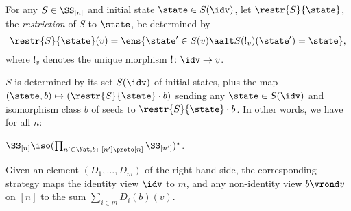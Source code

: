 \documentclass{LMCS}
\theoremstyle{plain}\newtheorem{satz}[thm]{Satz}
\begin{document}
\begin{defi}\label{def:restriction}
  For any $S \in \SS_{[n]}$ and initial state $\state \in S(\idv)$, let $\restr{S}{\state}$,
   the \emph{restriction} of $S$ to $\state$, be determined by
$$\restr{S}{\state} (v) = \ens{\state' \in S(v) \aalt S(!_v)(\state') = \state},$$
where $!_v$ denotes the unique morphism $!  \colon \idv \to v$.
\end{defi}
$S$ is determined by its set $S(\idv)$ of initial
states, plus the map $(\state, b) \mapsto (\restr{S}{\state}
\cdot b)$ sending any $\state \in S(\idv)$ and isomorphism class $b$
of seeds to $\restr{S}{\state} \cdot b$. In other words, we have
for all $n$:
\begin{thm}
   $\SS_{[n]} \iso (\prod_{n' \in \Nat, b \colon [n'] \proto [n]} \SS_{[n']})^\star$.
\end{thm}
Given an element $(D_1,\ldots,D_m)$ of the right-hand side, the
corresponding strategy maps the identity view $\idv$ to $m$, and any
non-identity view $b \vrond v$ on $[n]$ to the sum $\sum_{i \in m}
D_i(b)(v)$.
\end{document}
